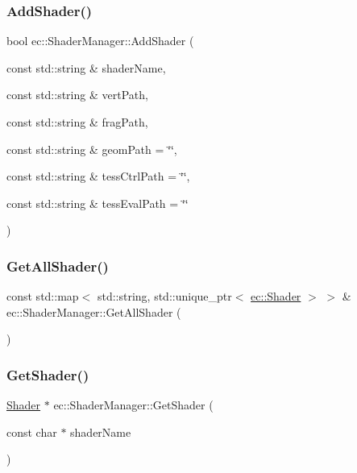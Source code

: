 \subsubsection{\texorpdfstring{Add\+Shader()}{AddShader()}}
{\footnotesize\ttfamily bool ec\+::\+Shader\+Manager\+::\+Add\+Shader (\begin{DoxyParamCaption}\item[{const std\+::string \&}]{shader\+Name,  }\item[{const std\+::string \&}]{vert\+Path,  }\item[{const std\+::string \&}]{frag\+Path,  }\item[{const std\+::string \&}]{geom\+Path = {\ttfamily \char`\"{}\char`\"{}},  }\item[{const std\+::string \&}]{tess\+Ctrl\+Path = {\ttfamily \char`\"{}\char`\"{}},  }\item[{const std\+::string \&}]{tess\+Eval\+Path = {\ttfamily \char`\"{}\char`\"{}} }\end{DoxyParamCaption})}

\mbox{\label{classec_1_1_shader_manager_a0a0cc15d1f843a8bc39999792c26e762}} 
\subsubsection{\texorpdfstring{Get\+All\+Shader()}{GetAllShader()}}
{\footnotesize\ttfamily const std\+::map$<$ std\+::string, std\+::unique\+\_\+ptr$<$ \mbox{\hyperlink{classec_1_1_shader}{ec\+::\+Shader}} $>$ $>$ \& ec\+::\+Shader\+Manager\+::\+Get\+All\+Shader (\begin{DoxyParamCaption}{ }\end{DoxyParamCaption})}

\mbox{\label{classec_1_1_shader_manager_a52f341542759f5fd2c0013133f1007ab}} 
\subsubsection{\texorpdfstring{Get\+Shader()}{GetShader()}}
{\footnotesize\ttfamily \mbox{\hyperlink{classec_1_1_shader}{Shader}} $\ast$ ec\+::\+Shader\+Manager\+::\+Get\+Shader (\begin{DoxyParamCaption}\item[{const char $\ast$}]{shader\+Name }\end{DoxyParamCaption})}


